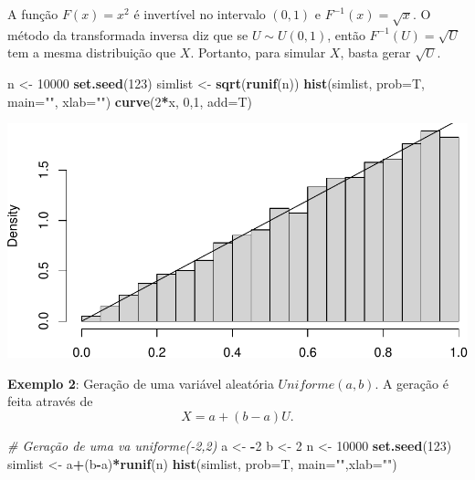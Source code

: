\documentclass[
]{book}
\newenvironment{Shaded}{\begin{snugshade}}{\end{snugshade}}
\newcommand{\AttributeTok}[1]{\textcolor[rgb]{0.13,0.29,0.53}{#1}}
\newcommand{\CommentTok}[1]{\textcolor[rgb]{0.56,0.35,0.01}{\textit{#1}}}
\newcommand{\DecValTok}[1]{\textcolor[rgb]{0.00,0.00,0.81}{#1}}
\newcommand{\FunctionTok}[1]{\textcolor[rgb]{0.13,0.29,0.53}{\textbf{#1}}}
\newcommand{\NormalTok}[1]{#1}
\newcommand{\OtherTok}[1]{\textcolor[rgb]{0.56,0.35,0.01}{#1}}
\newcommand{\SpecialCharTok}[1]{\textcolor[rgb]{0.81,0.36,0.00}{\textbf{#1}}}
\newcommand{\StringTok}[1]{\textcolor[rgb]{0.31,0.60,0.02}{#1}}
\begin{document}
A função \(F(x)=x^2\) é invertível no intervalo \((0,1)\) e
\(F^{-1}(x)=\sqrt{x}\). O método da transformada inversa diz que se
\(U\sim U(0,1)\), então \(F^{-1}(U)=\sqrt{U}\) tem a mesma distribuição que
\(X\). Portanto, para simular \(X\), basta gerar \(\sqrt{U}\).

\begin{Shaded}
\begin{Highlighting}[]
\NormalTok{n }\OtherTok{\textless{}{-}} \DecValTok{10000}
\FunctionTok{set.seed}\NormalTok{(}\DecValTok{123}\NormalTok{)}
\NormalTok{simlist }\OtherTok{\textless{}{-}} \FunctionTok{sqrt}\NormalTok{(}\FunctionTok{runif}\NormalTok{(n))}
\FunctionTok{hist}\NormalTok{(simlist, }\AttributeTok{prob=}\NormalTok{T, }\AttributeTok{main=}\StringTok{""}\NormalTok{, }\AttributeTok{xlab=}\StringTok{""}\NormalTok{)}
\FunctionTok{curve}\NormalTok{(}\DecValTok{2}\SpecialCharTok{*}\NormalTok{x, }\DecValTok{0}\NormalTok{,}\DecValTok{1}\NormalTok{, }\AttributeTok{add=}\NormalTok{T)}
\end{Highlighting}
\end{Shaded}

\includegraphics{introR_files/figure-latex/unnamed-chunk-282-1.pdf}

\textbf{Exemplo 2}: Geração de uma variável aleatória \(Uniforme(a,b)\). A
geração é feita através de \[X = a+(b-a)U.\]

\begin{Shaded}
\begin{Highlighting}[]
\CommentTok{\# Geração de uma va uniforme({-}2,2)}
\NormalTok{a }\OtherTok{\textless{}{-}} \SpecialCharTok{{-}}\DecValTok{2}
\NormalTok{b }\OtherTok{\textless{}{-}} \DecValTok{2}
\NormalTok{n }\OtherTok{\textless{}{-}} \DecValTok{10000}
\FunctionTok{set.seed}\NormalTok{(}\DecValTok{123}\NormalTok{)}
\NormalTok{simlist }\OtherTok{\textless{}{-}}\NormalTok{ a}\SpecialCharTok{+}\NormalTok{(b}\SpecialCharTok{{-}}\NormalTok{a)}\SpecialCharTok{*}\FunctionTok{runif}\NormalTok{(n)}
\FunctionTok{hist}\NormalTok{(simlist, }\AttributeTok{prob=}\NormalTok{T, }\AttributeTok{main=}\StringTok{""}\NormalTok{,}\AttributeTok{xlab=}\StringTok{""}\NormalTok{)}
\end{Highlighting}
\end{Shaded}
\end{document}
